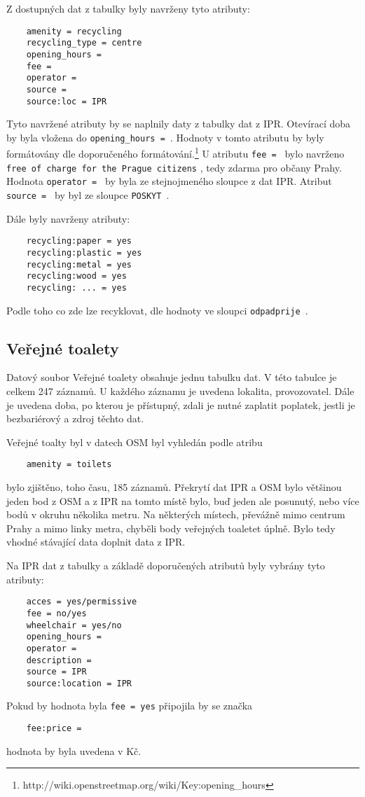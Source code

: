 Z dostupných dat z tabulky byly navrženy tyto atributy: 
\begin{verbatim}
    amenity = recycling
    recycling_type = centre
    opening_hours =
    fee =
    operator = 
    source = 
    source:loc = IPR
\end{verbatim}
Tyto navržené atributy by se naplnily daty z tabulky dat z IPR.
Otevírací doba by byla vložena do {\tt opening\_hours~= }.
Hodnoty v tomto atributu by byly formátovány dle doporučeného formátování.\footnote{http://wiki.openstreetmap.org/wiki/Key:opening\_hours}
 U atributu {\tt fee~= }
bylo navrženo {\tt free of charge for the Prague citizens} , tedy zdarma pro občany Prahy.
Hodnota {\tt operator~= } by byla ze stejnojmeného sloupce z dat IPR.
Atribut {\tt source~= } by byl ze sloupce {\tt POSKYT }.

Dále byly navrženy atributy:
\begin{verbatim}
    recycling:paper = yes
    recycling:plastic = yes
    recycling:metal = yes
    recycling:wood = yes
    recycling: ... = yes
\end{verbatim}
Podle toho co zde lze recyklovat, dle hodnoty ve sloupci {\tt odpadprije }.


\subsection{Veřejné toalety}
\label{Veřejné toalety}
Datový soubor Veřejné toalety obsahuje jednu tabulku dat. V této tabulce je 
celkem 247 záznamů. U každého záznamu je uvedena lokalita, provozovatel. 
Dále je uvedena doba, po kterou je přístupný, zdali je nutné zaplatit poplatek,
jestli je bezbariérový a zdroj těchto dat.

Veřejné toalty byl v datech OSM byl vyhledán podle atribu
\begin{verbatim}
    amenity = toilets
\end{verbatim}

bylo zjištěno, toho času, 185 záznamů. Překrytí dat IPR a OSM bylo většinou
jeden bod z OSM a z IPR na tomto místě bylo, buď jeden ale posunutý, nebo
více bodů v okruhu několika metru. Na některých místech, převážně mimo centrum
Prahy a mimo linky metra, chyběli body veřejných toaletet úplně.
Bylo tedy vhodné stávající data doplnit data z IPR.

Na IPR dat z tabulky a základě doporučených atributů byly vybrány tyto atributy:
\begin{verbatim}
    acces = yes/permissive
    fee = no/yes
    wheelchair = yes/no
    opening_hours =
    operator =
    description =
    source = IPR
    source:location = IPR
\end{verbatim}
Pokud by hodnota byla {\tt fee~=~yes} připojila by se značka
\begin{verbatim}
    fee:price =
\end{verbatim}
hodnota by byla uvedena v Kč.

